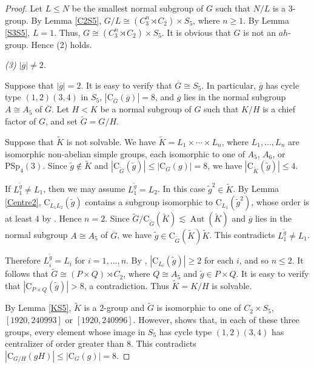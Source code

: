 \documentclass[11pt]{article}
\providecommand{\PSp}{{\mathrm{PSp}}}
\providecommand{\C}{{\mathrm{C}}}
\providecommand{\Aut}{{\operatorname{Aut}}}
\providecommand{\olg}{{\overline{g}}}
\providecommand{\olG}{{\overline{G}}}
\begin{document}
\begin{proof}
    Let $L\leq N$ be the smallest normal subgroup of $G$ such that $N/L$ is a $3$-group.
    By Lemma \ref{C2S5}, $G/L\cong (C_3^n\rtimes C_2)\times S_5$, where $n\geq 1$.
    By Lemma \ref{S3S5}, $L=1$.
    Thus, $G\cong (C_3^n\rtimes C_2)\times S_5$.
    It is obvious that $G$ is not an $ah$-group.
    Hence (2) holds.

    
\medskip    
{\sl (3) $|\olg|\neq 2$. }

    Suppose that $|\olg|=2$.
    It is easy to verify that $\olG\cong S_5$.
    In particular, $\olg$ has cycle type $(1,2)(3,4)$ in $S_5$,
    $|\C_{\olG}(\olg)|=8$, and $\olg$ lies in the normal subgroup $A\cong A_5$ of $\olG$.
    Let $H<K$ be a normal subgroup of $G$ such that $K/H$ is a chief factor of $G$,
    and set $\widetilde G=G/H$.

    Suppose that $\widetilde K$ is not solvable.
    We have $\widetilde K=L_1\times\cdots\times L_n$,
    where $L_1,\ldots,L_n$ are isomorphic non-abelian simple groups,
    each isomorphic to one of $A_5$, $A_6$, or $\PSp_4(3)$.
    Since $\widetilde g\notin \widetilde K$ and
    $|\C_{\widetilde G}(\widetilde g)|\leq |\C_G(g)|=8$,
    we have $|\C_{\widetilde K}(\widetilde g)|\leq 4$.

    If $L_1^{\widetilde g}\neq L_1$, then we may assume
    $L_1^{\widetilde g}=L_2$.
    In this case $\widetilde g^2\in \widetilde K$.
    By Lemma \ref{Centre2}, $\C_{L_1L_2}(\widetilde g)$ contains a subgroup
    isomorphic to $\C_{L_1}(\widetilde g^2)$,
    whose order is at least $4$ by \cite[Code 1]{Git}.
    Hence $n=2$.
    Since $\widetilde G/\C_{\widetilde G}(\widetilde K)\lesssim \Aut(\widetilde K)$
    and $\olg$ lies in the normal subgroup $A\cong A_5$ of $\olG$,
    we have $\widetilde g\in \C_{\widetilde G}(\widetilde K)\widetilde K$.
    This contradicts $L_1^{\widetilde g}\neq L_1$.

    Therefore $L_i^{\widetilde g}=L_i$ for $i=1,\ldots,n$.
    By \cite[Code 1]{Git}, $|\C_{L_i}(\widetilde g)|\geq 2$ for each $i$,
    and so $n\leq 2$.
    It follows that $\widetilde G\cong (P\times Q)\rtimes C_2$,
    where $Q\cong A_5$ and $\widetilde g\in P\times Q$.
    It is easy to verify that $|\C_{P\times Q}(\widetilde g)|>8$,
    a contradiction.
    Thus $\widetilde K=K/H$ is solvable.

    By Lemma \ref{KS5}, $\widetilde K$ is a $2$-group and $\widetilde G$ is
    isomorphic to one of $C_2\times S_5$, $[1920,240993]$ or $[1920,240996]$.
    However, \cite[Code 16]{Git} shows that, in each of these three groups,
    every element whose image in $S_5$ has cycle type $(1,2)(3,4)$ has centralizer
    of order greater than $8$.
    This contradicts $|\C_{G/H}(gH)|\leq |\C_G(g)|=8$.
\end{proof}
\end{document}
